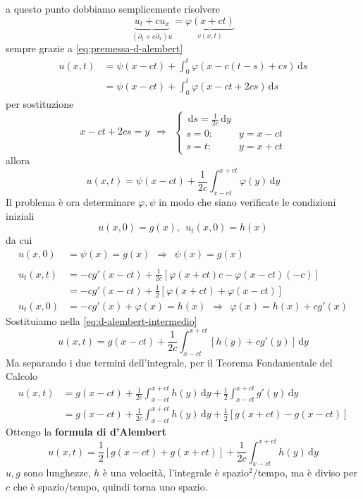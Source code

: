 \documentclass[10pt,a4paper,twoside,openright]{book}
\newcommand{\de}{\,\mathrm d}
\newcommand{\dy}{\de y}
\newcommand{\ds}{\de s}
\begin{document}
a questo punto dobbiamo semplicemente risolvere
\begin{equation*}
	\underbrace{u_{t} +cu_{x}}_{(\partial _{t} +c\partial _{x}) u} =\underbrace{\varphi (x+ct)}_{v(x,t)}
\end{equation*}
sempre grazie a \eqref{eq:premessa-d-alembert}
\begin{align*}
	u(x,t) & =\psi (x-ct) +\int ^{t}_{0} \varphi (x-c(t-s) +cs) \ds \\
	        & =\psi (x-ct) +\int ^{t}_{0} \varphi (x-ct+2cs) \ds      
\end{align*}
per sostituzione
\begin{equation*}
	x-ct+2cs=y\ \ \Rightarrow \ \ \begin{cases}
	\ds=\frac{1}{2c} \dy & \\
	s=0: & y=x-ct\\
	s=t: & y=x+ct
	\end{cases}
\end{equation*}
allora
\begin{equation}
	u(x,t) =\psi (x-ct) +\frac{1}{2c}\int ^{x+ct}_{x-ct} \varphi (y) \dy
	\label{eq:d-alembert-intermedio}
\end{equation}
Il problema è ora determinare $\varphi ,\psi $ in modo che siano verificate le condizioni iniziali
\begin{equation*}
	u(x,0) =g(x) ,\ \ u_{t}(x,0) =h(x)
\end{equation*}
da cui
\begin{align*}
	u(x,0)     & =\psi (x) =g(x) \ \ \Rightarrow \ \ \boxed{\psi (x) =g(x)}                          \\
	            &                                                                                         \\
	u_{t}(x,t) & =-cg'(x-ct) +\frac{1}{2c}[ \varphi (x+ct) c-\varphi (x-ct)(-c)]                     \\
	            & =-cg'(x-ct) +\frac{1}{2}[ \varphi (x+ct) +\varphi (x-ct)]                            \\
	u_{t}(x,0) & =-cg'(x) +\varphi (x) =h(x) \ \ \Rightarrow \ \ \boxed{\varphi (x) =h(x) +cg'(x)} 
\end{align*}
Sostituiamo nella \eqref{eq:d-alembert-intermedio}
\begin{equation*}
	u(x,t) =g(x-ct) +\frac{1}{2c}\int ^{x+ct}_{x-ct}[ h(y) +cg'(y)] \dy
\end{equation*}
Ma separando i due termini dell'integrale, per il Teorema Fondamentale del Calcolo
\begin{align*}
	u(x,t) & =g(x-ct) +\frac{1}{2c}\int ^{x+ct}_{x-ct} h(y) \dy+\frac{1}{2}\int ^{x+ct}_{x-ct} g'(y) \dy \\
	        & =g(x-ct) +\frac{1}{2c}\int ^{x+ct}_{x-ct} h(y) \dy+\frac{1}{2}[ g(x+ct) -g(x-ct)]         
\end{align*}
Ottengo la \textbf{formula di d'Alembert}
\begin{equation}
	\boxed{u(x,t) =\frac{1}{2}[ g(x-ct) +g(x+ct)] +\frac{1}{2c}\int ^{x+ct}_{x-ct} h(y) \dy}
\end{equation}
$u,g$ sono lunghezze, $h$ è una velocità, l'integrale è spazio$^{2}$/tempo, ma è diviso per $c$ che è spazio/tempo, quindi torna uno spazio.
\end{document}
